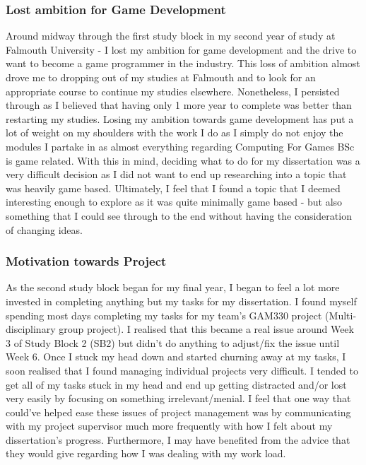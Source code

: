 \subsubsection{Lost ambition for Game Development}
Around midway through the first study block in my second year of study at Falmouth University - I lost my ambition for game development and the drive to want to become a game programmer in the industry. This loss of ambition almost drove me to dropping out of my studies at Falmouth and to look for an appropriate course to continue my studies elsewhere. Nonetheless, I persisted through as I believed that having only 1 more year to complete was better than restarting my studies. Losing my ambition towards game development has put a lot of weight on my shoulders with the work I do as I simply do not enjoy the modules I partake in as almost everything regarding Computing For Games BSc is game related. With this in mind, deciding what to do for my dissertation was a very difficult decision as I did not want to end up researching into a topic that was heavily game based. Ultimately, I feel that I found a topic that I deemed interesting enough to explore as it was quite minimally game based - but also something that I could see through to the end without having the consideration of changing ideas.
\\
\subsubsection{Motivation towards Project}
As the second study block began for my final year, I began to feel a lot more invested in completing anything but my tasks for my dissertation. I found myself spending most days completing my tasks for my team's GAM330 project (Multi-disciplinary group project). I realised that this became a real issue around Week 3 of Study Block 2 (SB2) but didn't do anything to adjust/fix the issue until Week 6. Once I stuck my head down and started churning away at my tasks, I soon realised that I found managing individual projects very difficult. I tended to get all of my tasks stuck in my head and end up getting distracted and/or lost very easily by focusing on something irrelevant/menial. I feel that one way that could've helped ease these issues of project management was by communicating with my project supervisor much more frequently with how I felt about my dissertation's progress. Furthermore, I may have benefited from the advice that they would give regarding how I was dealing with my work load.
\\
